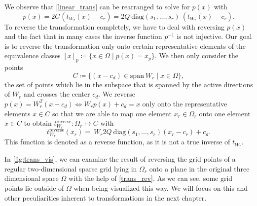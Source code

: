 \documentclass[
  a4paper,  %
  twoside,  %
  bibliography=totoc,
  headsepline,
  cleardoublepage=empty,
  parskip=half,
  draft=false
]{scrbook}
\begin{document}
We observe that \cref{linear_trans} can be rearranged to solve for $p(x)$ with
\begin{equation}
p(x)=2 G (t_{W_r}(x) - c_r)=2 Q ~ \text{diag}(s_1, \dots, s_r) ~ (t_{W_r}(x) - c_r).
\label{proj}
\end{equation}
To reverse the transformation completely, we have to deal with reversing $p(x)$ and the fact that in many cases the inverse function $p^{-1}$ is not injective.
Our goal is to reverse the transformation only onto certain representative elements of the equivalence classes $[x]_p \coloneqq \{x \in \Omega \mid p(x)=x_{p}\}$.
We then only consider the points
\begin{equation}
C \coloneqq \{(x - c_d) \in \text{span} ~ W_r \mid x \in \Omega\},
\label{proj_rep}
\end{equation}
\ie the set of points which lie in the subspace that is spanned by the active directions of $W_r$ and crosses the center $c_d$.
We reverse $p(x)=W_r^T (x-c_d) \Leftrightarrow W_r p(x) + c_d = x$ only onto the representative elements $x \in C$ so that we are able to map one element $x_r \in \Omega_r$ onto one element $x \in C$ to obtain $t_{W_r}^{\text{reverse}}\colon \Omega_r \mapsto C$ with
\begin{equation}
t_{W_r}^{\text{reverse}}(x_r) = ~W_r 2 Q ~ \text{diag}\left(s_1, \dots, s_r\right) (x_r - c_r) + c_d.
\label{trans_rev}
\end{equation}
%
This function is denoted as a reverse function, as it is not a true inverse of $t_{W_r}$.

In \cref{fig:trans_vis}, we can examine the result of reversing the grid points of a regular two-dimensional sparse grid lying in $\Omega_r$ onto a plane in the original three dimensional space $\Omega$ with the help of \cref{trans_rev}.
As we can see, some grid points lie outside of $\Omega$ when being visualized this way.
We will focus on this and other peculiarities inherent to transformations in the next chapter.
\end{document}
